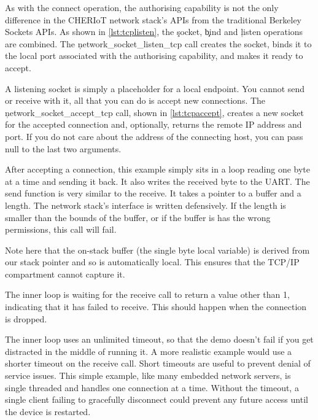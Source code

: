 \codelisting[filename=examples/tcp_echo_server/tcp.cc,marker=server_capability,label=lst:tcplistencap,caption="A static capability that authorises binding to a local port."]{}

As with the connect operation, the authorising capability is not the only difference in the CHERIoT network stack's APIs from the traditional Berkeley Sockets APIs.
As shown in \ref{lst:tcplisten}, the \c{socket}, \c{bind} and \c{listen} operations are combined.
The \c{network_socket_listen_tcp} call creates the socket, binds it to the local port associated with the authorising capability, and makes it ready to accept.

\codelisting[filename=examples/tcp_echo_server/tcp.cc,marker=listen,label=lst:tcplisten,caption="Listening for TCP connections to a local port."]{}

A listening socket is simply a placeholder for a local endpoint.
You cannot send or receive with it, all that you can do is accept new connections.
The \c{network_socket_accept_tcp} call, shown in \ref{lst:tcpaccept}, creates a new socket for the accepted connection and, optionally, returns the remote IP address and port.
If you do not care about the address of the connecting host, you can pass null to the last two arguments.

\codelisting[filename=examples/tcp_echo_server/tcp.cc,marker=accept,label=lst:tcpaccept,caption="Accepting TCP connections and running a simple echo-server loop."]{}

After accepting a connection, this example simply sits in a loop reading one byte at a time and sending it back.
It also writes the received byte to the UART.
The send function is very similar to the receive.
It takes a pointer to a buffer and a length.
The network stack's interface is written defensively.
If the length is smaller than the bounds of the buffer, or if the buffer is has the wrong permissions, this call will fail.


Note here that the on-stack buffer (the single byte local variable) is derived from our stack pointer and so is automatically local.
This ensures that the TCP/IP compartment cannot capture it.

The inner loop is waiting for the receive call to return a value other than 1, indicating that it has failed to receive.
This should happen when the connection is dropped.

The inner loop uses an unlimited timeout, so that the demo doesn't fail if you get distracted in the middle of running it.
A more realistic example would use a shorter timeout on the receive call.
Short timeouts are useful to prevent denial of service issues.
This simple example, like many embedded network servers, is single threaded and handles one connection at a time.
Without the timeout, a single client failing to gracefully disconnect could prevent any future access until the device is restarted.

